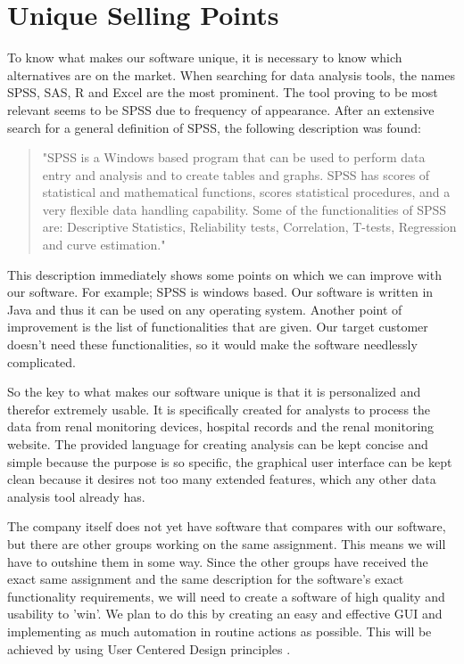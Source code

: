 \documentclass[a4paper]{article}
\begin{document}
\section{Unique Selling Points}
To know what makes our software unique, it is necessary to know which alternatives are on the market. When searching for data analysis tools, the names SPSS, SAS, R and Excel are the most prominent. The tool proving to be most relevant seems to be SPSS due to frequency of appearance. After an extensive search for a general definition of SPSS, the following description was found: 
\begin{quotation}
"SPSS is a Windows based program that can be used to perform data entry and analysis
and to create tables and graphs. SPSS has scores of statistical and mathematical functions,
scores statistical procedures, and a very flexible data handling capability. Some of the
functionalities of SPSS are: Descriptive Statistics, Reliability tests, Correlation, T-tests,
Regression and curve estimation." \cite{SPSS}
\end{quotation}
\par 
This description immediately shows some points on which we can improve with our software. For example; SPSS is windows based. Our software is written in Java and thus it can be used on any operating system. Another point of improvement is the list of functionalities that are given. Our target customer doesn't need these functionalities, so it would make the software needlessly complicated.
\par
So the key to what makes our software unique is that it is personalized and therefor extremely usable. It is specifically created for analysts to process the data from renal monitoring devices, hospital records and the renal monitoring website. The provided language for creating analysis can be kept concise and simple because the purpose is so specific, the graphical user interface can be kept clean because it desires not too many extended features, which any other data analysis tool already has. 
\par 
The company itself does not yet have software that compares with our software, but there are other groups working on the same assignment. This means we will have to outshine them in some way. Since the other groups have received the exact same assignment and the same description for the software's exact functionality requirements, we will need to create a software of high quality and usability to 'win'. We plan to do this by creating an easy and effective GUI and implementing as much automation in routine actions as possible. This will be achieved by using User Centered Design principles \cite{Nielsen}.
\end{document}

